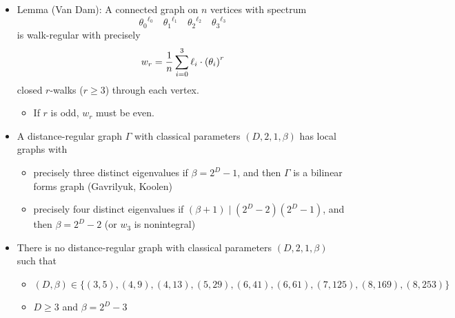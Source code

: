 \documentclass[11pt]{article}
\providecommand{\tightlist}{%
      \setlength{\itemsep}{0pt}\setlength{\parskip}{0pt}}
\renewcommand{\textbf}[1]{\textcolor[rgb]{1,0,0}{{#1}}}
\renewcommand{\emph}[1]{\textcolor[rgb]{0,0,1}{{#1}}}
\renewcommand{\sout}[1]{\textcolor[rgb]{0,0.5,0}{{#1}}}
\begin{document}
\begin{itemize}
\tightlist
\item
  \textbf{Lemma} (\emph{Van Dam}): A \emph{connected graph} on
  \textbf{\(n\)} vertices with \emph{spectrum} \textbf{\[
  {\theta_0}^{\ell_0} \quad
  {\theta_1}^{\ell_1} \quad
  {\theta_2}^{\ell_2} \quad
  {\theta_3}^{\ell_3}
  \]} is \sout{walk-regular} with precisely \sout{\[
  w_r = {1 \over n} \sum_{i=0}^3 \ell_i \cdot {(\theta_i)}^r
  \]} \emph{closed \(r\)-walks} (\textbf{\(r \ge 3\)}) through
  \emph{each vertex}.

  \begin{itemize}
  \tightlist
  \item
    If \textbf{\(r\)} is \emph{odd}, \textbf{\(w_r\)} must be
    \sout{even}.
  \end{itemize}
\item
  A \emph{distance-regular graph} \textbf{\(\Gamma\)} with
  \emph{classical parameters} \textbf{\((D, 2, 1, \beta)\)} has
  \emph{local graphs} with

  \begin{itemize}
  \tightlist
  \item
    precisely \textbf{three distinct eigenvalues} if
    \textbf{\(\beta = 2^D - 1\)}, and then \emph{\(\Gamma\)} is a
    \sout{bilinear forms graph} (Gavrilyuk, Koolen)
  \item
    precisely \textbf{four distinct eigenvalues} if
    \textbf{\((\beta+1) \mid (2^D-2)(2^D-1)\)}, and then
    \sout{\(\beta = 2^D-2\)} (or \emph{\(w_3\)} is \sout{nonintegral})
  \end{itemize}
\item
  There is no \emph{distance-regular graph} with \emph{classical
  parameters} \textbf{\((D, 2, 1, \beta)\)} such that

  \begin{itemize}
  \tightlist
  \item
    \sout{\((D, \beta) \in \{(3, 5), (4, 9), (4, 13), (5, 29), (6, 41), (6, 61), (7, 125), (8, 169), (8, 253)\}\)}
  \item
    \sout{\(D \ge 3\)} and \sout{\(\beta = 2^D - 3\)}
  \end{itemize}
\end{itemize}


    
    
    
\end{document}
